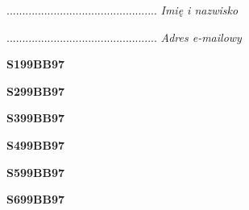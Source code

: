 \begin{turn}{90}\begin{minipage}{\linewidth} \vspace{20mm} ................................................  \textit{Imię i nazwisko}\end{minipage}\end{turn}

\begin{turn}{90}\begin{minipage}{\linewidth} \vspace{20mm} ................................................  \textit{Adres e-mailowy}\end{minipage}\end{turn}

\begin{turn}{90}\huge \begin{minipage}{\linewidth} \vspace{10mm}\textbf{S199BB97}\end{minipage}\end{turn}

\begin{turn}{90}\huge \begin{minipage}{\linewidth} \vspace{10mm}\textbf{S299BB97}\end{minipage}\end{turn}

\begin{turn}{90}\huge \begin{minipage}{\linewidth} \vspace{10mm}\textbf{S399BB97}\end{minipage}\end{turn}

\begin{turn}{90}\huge \begin{minipage}{\linewidth} \vspace{10mm}\textbf{S499BB97}\end{minipage}\end{turn}

\begin{turn}{90}\huge \begin{minipage}{\linewidth} \vspace{10mm}\textbf{S599BB97}\end{minipage}\end{turn}

\begin{turn}{90}\huge \begin{minipage}{\linewidth} \vspace{10mm}\textbf{S699BB97}\end{minipage}\end{turn}

